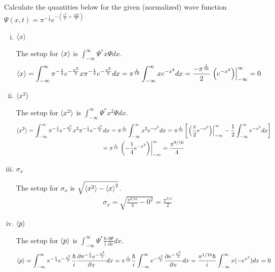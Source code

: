 \documentclass[10pt,letterpaper]{article}
\begin{document}
\begin{enumerate}
Calculate the quantities below for the given (normalized) wave function $\Psi(x, t) = \pi^{-\frac{1}{4}}e^{-(\frac{x^{2}}{2} + \frac{iEt}{\hbar})}$

\begin{enumerate}[i)]

\item $\braket{x}$

\color{violet}
The setup for $\braket{x}$ is $\int_{-\infty}^{\infty} \Psi^{*} x \Psi dx$. 
\begin{gather*}
\braket{x} = \int_{-\infty}^{\infty} \pi^{-\frac{1}{4}} e^{-\frac{x^{2}}{2}} x \pi^{-\frac{1}{4}} e^{-\frac{x^{2}}{2}}dx = \pi^{\frac{1}{16}} \int_{-\infty}^{\infty} xe^{-x^{2}}dx = \frac{-\pi^{\frac{1}{16}}}{2} \left. \left( e^{-x^{2}} \right) \right\vert_{-\infty}^{\infty} = 0
\end{gather*}
\color{black}

\item $\braket{x^{2}}$

\color{violet}
The setup for $\braket{x^{2}}$ is $\int_{-\infty}^{\infty} \Psi^{*} x^{2} \Psi dx$. 
\begin{gather*}
\braket{x^{2}} = \int_{-\infty}^{\infty} \pi^{-\frac{1}{4}} e^{-\frac{x^{2}}{2}} x^{2} \pi^{-\frac{1}{4}} e^{-\frac{x^{2}}{2}}dx = \pi^{\frac{1}{16}} \int_{-\infty}^{\infty} x^{2} e^{-x^{2}}dx = \pi^{\frac{1}{16}} \left[ \left. \left( \frac{x}{2} e^{-x^{2}} \right) \right\vert_{-\infty}^{\infty} - \frac{1}{2} \int_{-\infty}^{\infty} e^{-x^{2}}dx \right] \\
= \pi^{\frac{1}{16}} \left. \left( -\frac{1}{4} e^{-x^{2}} \right) \right\vert_{-\infty}^{\infty} = \frac{\pi^{9/16}}{4	}
\end{gather*}
\color{black}

\item $\sigma_{x}$

\color{violet}
The setup for $\sigma_{x}$ is $\sqrt{\braket{x^{2}} - \braket{x}^{2}}$. 
\begin{gather*}
\sigma_{x} = \sqrt{\frac{\pi^{9/16}}{4} - 0^{2}} = \frac{\pi^{3/4}}{2}
\end{gather*}
\color{black}

\item $\braket{p}$

\color{violet}
The setup for $\braket{p}$ is $\int_{-\infty}^{\infty} \Psi^{*} \frac{\hbar}{i} \frac{\partial \Psi}{\partial x}dx$.
\begin{gather*}
\braket{p} = \int_{-\infty}^{\infty} \pi^{-\frac{1}{4}} e^{-\frac{x^{2}}{2}} \frac{\hbar}{i} \frac{\partial \pi^{-\frac{1}{4}} e^{-\frac{x^{2}}{2}}}{\partial x}dx = \pi^{\frac{1}{16}} \frac{\hbar}{i} \int_{-\infty}^{\infty} e^{-\frac{x^2}{2}} \frac{\partial e^{-\frac{x^{2}}{2}}}{\partial x} dx = \frac{\pi^{1/16}\hbar}{i} \int_{-\infty}^{\infty} x (-e^{x^{2}})dx = 0
\end{gather*}
\color{black}


\end{enumerate}
\end{enumerate}
\end{document}

